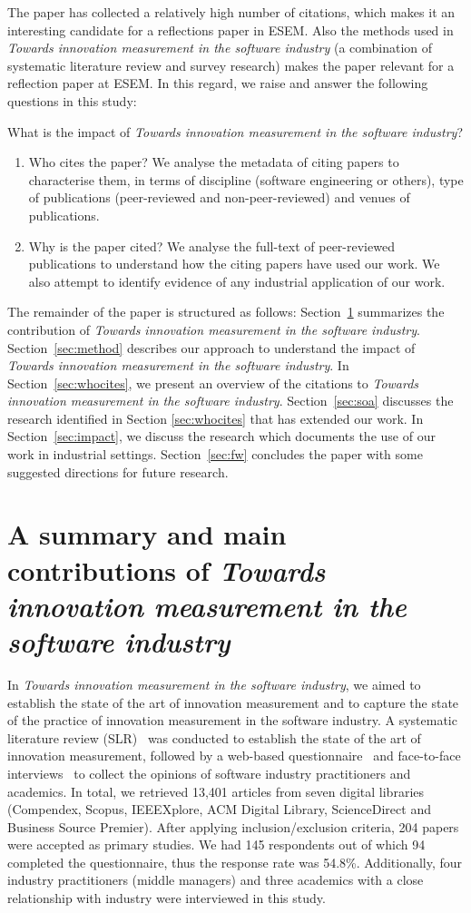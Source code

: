 \documentclass[sigconf,review]{acmart}
\newcommand{\theArticle}{\textit{Towards innovation measurement in the software industry}}
\begin{document}
The paper has collected a relatively high number of citations, which makes it an interesting candidate for a reflections paper in ESEM. Also the methods used in \theArticle{} (a combination of systematic literature review and survey research) makes the paper relevant for a reflection paper at ESEM. In this regard, we raise and answer the following questions in this study:

What is the impact of \theArticle? 
\begin{enumerate}
    \item Who cites the paper? We analyse the metadata of citing papers to characterise them, in terms of discipline (software engineering or others), type of publications (peer-reviewed and non-peer-reviewed) and venues of publications.
    \item Why is the paper cited? We analyse the full-text of peer-reviewed publications to understand how the citing papers have used our work. We also attempt to identify evidence of any industrial application of our work.
\end{enumerate}

The remainder of the paper is structured as follows: Section~\ref{sec:sumpaper} summarizes the contribution of \theArticle. Section~\ref{sec:method} describes our approach to understand the impact of \theArticle. In Section~\ref{sec:whocites}, we present an overview of the citations to \theArticle. Section~\ref{sec:soa} discusses the research identified in Section \ref{sec:whocites} that has extended our work. In Section~\ref{sec:impact}, we discuss the research which documents the use of our work in industrial settings. Section~\ref{sec:fw} concludes the paper with some suggested directions for future research.

\section{A summary and main contributions of \theArticle} %
\label{sec:sumpaper}
In \theArticle, we aimed to establish the state of the art of innovation measurement and to capture the state of the practice of innovation measurement in the software industry. A systematic literature review (SLR)~\cite{kitchenham07} was conducted to establish the state of the art of innovation measurement, followed by a web-based questionnaire~\cite{kasunic05} and face-to-face interviews~\cite{creswell09} to collect the opinions of software industry practitioners and academics. In total, we retrieved 13,401 articles from seven digital libraries (Compendex, Scopus, IEEEXplore, ACM Digital Library, ScienceDirect and Business Source Premier). After applying inclusion\slash exclusion criteria, 204 papers were accepted as primary studies. We had 145 respondents out of which 94 completed the questionnaire, thus the response rate was 54.8\%. Additionally, four industry practitioners (middle managers) and three academics with a close relationship with industry were interviewed in this study. 
\end{document}
